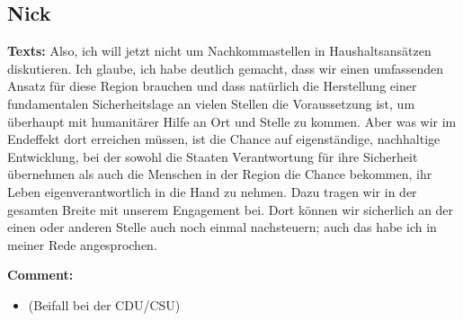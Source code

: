 \documentclass{article}
\begin{document}
\subsection{Nick}
\noindent\textbf{Texts:} Also, ich will jetzt nicht um Nachkommastellen in Haushaltsansätzen diskutieren. Ich glaube, ich habe deutlich gemacht, dass wir einen umfassenden Ansatz für diese Region brauchen und dass natürlich die Herstellung einer fundamentalen Sicherheitslage an vielen Stellen die Voraussetzung ist, um überhaupt mit humanitärer Hilfe an Ort und Stelle zu kommen. Aber was wir im Endeffekt dort erreichen müssen, ist die Chance auf eigenständige, nachhaltige Entwicklung, bei der sowohl die Staaten Verantwortung für ihre Sicherheit übernehmen als auch die Menschen in der Region die Chance bekommen, ihr Leben eigenverantwortlich in die Hand zu nehmen. Dazu tragen wir in der gesamten Breite mit unserem Engagement bei. Dort können wir sicherlich an der einen oder anderen Stelle auch noch einmal nachsteuern; auch das habe ich in meiner Rede angesprochen.  

\noindent\textbf{Comment:}
\begin{itemize}
    \setlength\itemsep{-3pt}
    \item (Beifall bei der CDU/CSU)
\end{itemize}
\end{document}
